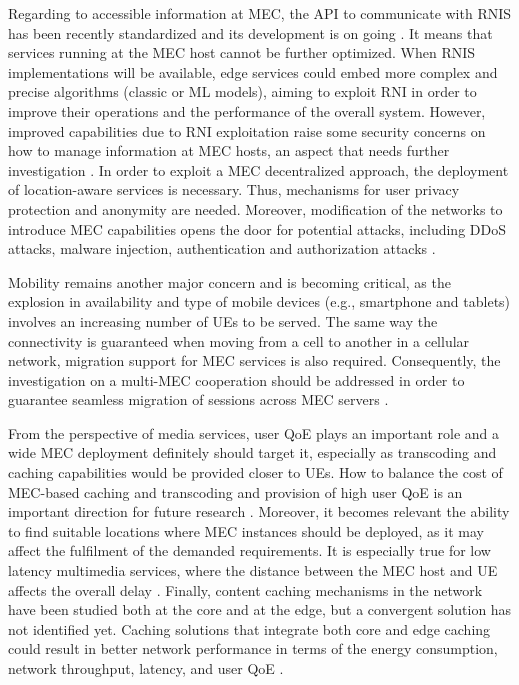 Regarding to accessible information at MEC, the API to communicate with RNIS \cite{etsigsmec012} has been recently standardized and its development is on going \cite{Arora2019, Tomaszewski2020}. It means that services running at the MEC host cannot be further optimized. When RNIS implementations will be available, edge services could embed more complex and precise algorithms (classic or ML models), aiming to exploit RNI in order to improve their operations and the performance of the overall system. However, improved capabilities due to RNI exploitation raise some security concerns on how to manage information at MEC hosts, an aspect that needs further investigation \cite{Jiang2021, Gur2020}. In order to exploit a MEC decentralized approach, the deployment of location-aware services is necessary. Thus, mechanisms for user privacy protection and anonymity are needed. Moreover, modification of the networks to introduce MEC capabilities opens the door for potential attacks, including DDoS attacks, malware injection, authentication and authorization attacks \cite{Roman2018, Xiao2019}.

Mobility remains another major concern and is becoming critical, as the explosion in availability and type of mobile devices (e.g., smartphone and tablets) involves an increasing number of UEs to be served.
The same way the connectivity is guaranteed when moving from a cell to another in a cellular network, migration support for MEC services is also required. Consequently, the investigation on a multi-MEC cooperation should be addressed in order to guarantee seamless migration of sessions across MEC servers \cite{Jiang2021, Shahzadi2017}.

From the perspective of media services, user QoE plays an important role and a wide MEC deployment definitely should target it, especially as transcoding and caching capabilities would be provided closer to UEs. %
How to balance the cost of MEC-based caching and transcoding and provision of high user QoE is an important direction for future research \cite{Jiang2021}.
Moreover, it becomes relevant the ability to find suitable locations where MEC instances should be deployed, as it may affect the fulfilment of the demanded requirements. It is especially true for low latency multimedia services, where the distance between the MEC host and UE affects the overall delay \cite{MartinPerez2019}.
Finally, content caching mechanisms in the network have been studied both at the core and at the edge, but a convergent solution has not identified yet. Caching solutions that integrate both core and edge caching could result in better network performance in terms of the energy
consumption, network throughput, latency, and user QoE \cite{Yao2019}.

